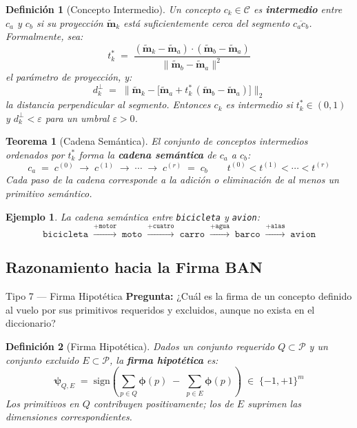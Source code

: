 \documentclass[12pt]{article}
\newtheorem{theorem}{Teorema}[section]
\newtheorem{definition}{Definición}[section]
\newtheorem{example}{Ejemplo}[section]
\begin{document}
\begin{definition}[Concepto Intermedio]
	Un concepto $c_k \in \mathcal{C}$ es \textbf{intermedio} entre $c_a$ y $c_b$ si
	su proyección $\tilde{\mathbf{m}}_k$ está suficientemente cerca del segmento
	$\overline{c_a c_b}$. Formalmente, sea:
	\[
	t_k^* \;=\; \frac{
		(\tilde{\mathbf{m}}_k - \tilde{\mathbf{m}}_a)
		\cdot
		(\tilde{\mathbf{m}}_b - \tilde{\mathbf{m}}_a)
	}{
		\|\tilde{\mathbf{m}}_b - \tilde{\mathbf{m}}_a\|^2
	}
	\]
	el parámetro de proyección, y:
	\[
	d_k^\perp \;=\;
	\bigl\|\tilde{\mathbf{m}}_k -
	\bigl[\tilde{\mathbf{m}}_a + t_k^*\,
	(\tilde{\mathbf{m}}_b - \tilde{\mathbf{m}}_a)\bigr]
	\bigr\|_2
	\]
	la distancia perpendicular al segmento. Entonces $c_k$ es intermedio si
	$t_k^* \in (0,1)$ y $d_k^\perp < \varepsilon$ para un umbral $\varepsilon > 0$.
\end{definition}

\begin{theorem}[Cadena Semántica]
	El conjunto de conceptos intermedios ordenados por $t_k^*$ forma la
	\textbf{cadena semántica} de $c_a$ a $c_b$:
	\[
	c_a \;=\; c^{(0)} \;\to\; c^{(1)} \;\to\; \cdots \;\to\; c^{(r)} \;=\; c_b
	\qquad t^{(0)} < t^{(1)} < \cdots < t^{(r)}
	\]
	Cada paso de la cadena corresponde a la adición o eliminación de al menos un
	primitivo semántico.
\end{theorem}

\begin{example}
	La cadena semántica entre \texttt{bicicleta} y \texttt{avion}:
	\[
	\texttt{bicicleta}
	\;\xrightarrow{+\texttt{motor}}\;
	\texttt{moto}
	\;\xrightarrow{+\texttt{cuatro}}\;
	\texttt{carro}
	\;\xrightarrow{+\texttt{agua}}\;
	\texttt{barco}
	\;\xrightarrow{+\texttt{alas}}\;
	\texttt{avion}
	\]
\end{example}

\subsection{Razonamiento hacia la Firma BAN}

\begin{razonbox}{Tipo 7 — Firma Hipotética}
	\textbf{Pregunta:} ¿Cuál es la firma de un concepto definido al vuelo por
	sus primitivos requeridos y excluidos, aunque no exista en el diccionario?
\end{razonbox}

\begin{definition}[Firma Hipotética]
	Dados un conjunto requerido $Q \subset \mathcal{P}$ y un conjunto excluido
	$E \subset \mathcal{P}$, la \textbf{firma hipotética} es:
	\[
	\bm{\psi}_{Q,E}
	\;=\; \mathrm{sign}\!\left(
	\sum_{p \in Q} \bm{\phi}(p)
	\;-\;
	\sum_{p \in E} \bm{\phi}(p)
	\right)
	\;\in\; \{-1,+1\}^m
	\]
	Los primitivos en $Q$ contribuyen positivamente; los de $E$ suprimen las
	dimensiones correspondientes.
\end{definition}
\end{document}
